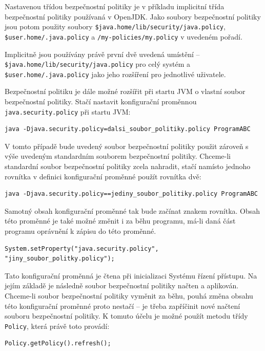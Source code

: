 Nastavenou třídou bezpečnostní politiky je v příkladu implicitní třída bezpečnostní politiky používaná v OpenJDK. Jako soubory bezpečnostní politiky jsou potom použity soubory {\tt \${java.home}/lib/security/java.policy}, {\tt \${user.home}/.java.policy} a {\tt /my-policies/my.policy} v uvedeném pořadí.

Implicitně jsou používány právě první dvě uvedená umístění -- {\tt \${java.home}/lib/security/java.policy} pro celý systém a {\tt \${user.home}/.java.policy} jako jeho rozšíření pro jednotlivé uživatele. \cite{refSecurity}

Bezpečnostní politiku je dále možné rozšířit při startu JVM o vlastní soubor bezpečnostní politiky. Stačí nastavit konfigurační proměnnou {\tt java.security.policy} při startu JVM: \cite[5.3.1]{oaks}

\begin{verbatim}
java -Djava.security.policy=dalsi_soubor_politiky.policy ProgramABC
\end{verbatim}

V tomto případě bude uvedený soubor bezpečnostní politiky použit zároveň s výše uvedeným standardním souborem bezpečnostní politiky. Chceme-li standardní soubor bezpečnostní politiky zcela nahradit, stačí namísto jednoho rovnítka v definici konfigurační proměnné použít rovnítka dvě: \cite[5.3.1]{oaks}

\begin{verbatim}
java -Djava.security.policy==jediny_soubor_politiky.policy ProgramABC
\end{verbatim}

Samotný obsah konfigurační proměnné tak bude začínat znakem rovnítka. Obsah této proměnné je také možné změnit i za běhu programu, má-li daná část programu oprávnění k zápisu do této proměnné.

\begin{verbatim}
System.setProperty("java.security.policy", "jiny_soubor_politky.policy");
\end{verbatim}

Tato konfigurační proměnná je čtena při inicializaci Systému řízení přístupu. Na jejím základě je následně soubor bezpečnostní politiky načten a aplikován. Chceme-li soubor bezpečnostní politiky vyměnit za běhu, pouhá změna obsahu této konfigurační proměnné proto nestačí -- je třeba zapříčinit nové načtení souboru bezpečnostní politiky. K tomuto účelu je možné použít metodu třídy {\tt Policy}, která právě toto provádí:

\begin{verbatim}
Policy.getPolicy().refresh();
\end{verbatim}

